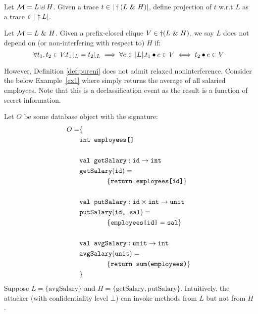 \documentclass[acmsmall,screen,review, nonacm]{acmart}
\begin{document}
\begin{definition}
  Let $\mathcal{M} = L \uplus H$. Given a trace $t \in |\dagger (L ~\&~ H)|$, define projection of $t$ w.r.t $L$ as a trace   $\in |\dagger L|$.
\end{definition}


\begin{definition}\label{def:pureni}
  Let $\mathcal{M} = L ~\&~ H$. Given a prefix-closed clique $V \in \dagger(L ~\&~ H)$, we say $L$ does not depend on (or non-interfering with respect to) $H$ if:
  \[
  \forall t_1, t_2 \in V. t_1{\downharpoonright_{ L}} =  t_2{\downharpoonright_{L}} \implies \forall e \in |L|. t_1  \bullet e \in V \iff t_2 \bullet e \in V
  \]
\end{definition}

However, Definition \ref{def:pureni} does not  admit  relaxed noninterference.
Consider the below Example~\ref{ex1} where   simply returns the average of all salaried employees. Note that this is a declassification event as the result is a function of secret information.


\begin{example} \label{ex1}
  Let $O$ be some database object with the signature:
  \begin{align*}
    O = & \{ \\
    & \texttt{int} \texttt{ employees[]} \\
    \\
    & \texttt{val } \texttt{getSalary}: \texttt{id} \to \texttt{int} \\
    & \texttt{getSalary} (\texttt{id}) =  \\
    & \qquad \qquad \{ \texttt{return employees[id]} \} \\
    \\
    & \texttt{val } \texttt{putSalary}: \texttt{id} \times \texttt{int} \to \texttt{unit} \\
    & \texttt{putSalary} ( \texttt{id, sal}) =  \\
    & \qquad \qquad   \{ \texttt{employees[id]} = \texttt{sal}  \} \\
    \\
    & \texttt{val } \texttt{avgSalary}: \texttt{unit} \to \texttt{int} \\
    & \texttt{avgSalary} (\texttt{unit}) =  \\
    & \qquad \qquad \{ \texttt{return sum(employees)} \} \\
    & \}
  \end{align*}
  Suppose $L = \{ \text{avgSalary} \}$ and $H = \{\text{getSalary}, \text{putSalary} \}$. Intuitively, the  attacker (with confidentiality level $\bot$) can  invoke  methods from $L$ but not from $H$.
  \end{example}
\end{document}
